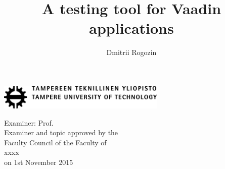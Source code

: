 \documentclass[12pt,a4paper,english%
]{tutthesis}
\author{Dmitrii Rogozin}
\title{A testing tool for Vaadin applications}      %
\begin{document}
\thispagestyle{empty}
\vspace*{-1cm}\noindent
\includegraphics[width=8cm]{tty_tut_logo}   %

\vspace{6.8cm}
\maketitle
\vspace{7cm} %

\begin{flushright}  
  \begin{minipage}[c]{6.8cm}
    \begin{spacing}{1.0}
      \textsf{Examiner: Prof. \@examiner}\\
      \textsf{Examiner and topic approved by the}\\ 
      \textsf{Faculty Council of the Faculty of}\\
      \textsf{xxxx}\\
      \textsf{on 1st November 2015}\\
    \end{spacing}
  \end{minipage}
\end{flushright}

\if@twoside
\clearpage
\fi
%
\setcounter{page}{0} %


\end{document}
